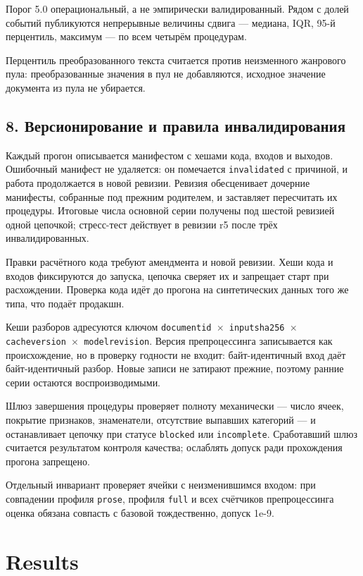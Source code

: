\documentclass[11pt,a4paper]{article}
\renewcommand{\_}{\textunderscore\allowbreak}
\begin{document}
Порог 5.0 операциональный, а не эмпирически валидированный. Рядом с долей
событий публикуются непрерывные величины сдвига — медиана, IQR, 95-й перцентиль,
максимум — по всем четырём процедурам.

Перцентиль преобразованного текста считается против неизменного жанрового пула:
преобразованные значения в пул не добавляются, исходное значение документа из
пула не убирается.

\subsection{8. Версионирование и правила инвалидирования}

Каждый прогон описывается манифестом с хешами кода, входов и выходов. Ошибочный
манифест не удаляется: он помечается \texttt{invalidated} с причиной, и работа
продолжается в новой ревизии. Ревизия обесценивает дочерние манифесты, собранные
под прежним родителем, и заставляет пересчитать их процедуры. Итоговые числа
основной серии получены под шестой ревизией одной цепочкой; стресс-тест действует
в ревизии r5 после трёх инвалидированных.

Правки расчётного кода требуют амендмента и новой ревизии. Хеши кода и входов
фиксируются до запуска, цепочка сверяет их и запрещает старт при расхождении.
Проверка кода идёт до прогона на синтетических данных того же типа, что подаёт
продакшн.

Кеши разборов адресуются ключом \texttt{document\_id $\times$ input\_sha256 $\times$ cache\_version $\times$
model\_revision}. Версия препроцессинга записывается как происхождение, но в
проверку годности не входит: байт-идентичный вход даёт байт-идентичный разбор.
Новые записи не затирают прежние, поэтому ранние серии остаются воспроизводимыми.

Шлюз завершения процедуры проверяет полноту механически — число ячеек, покрытие
признаков, знаменатели, отсутствие выпавших категорий — и останавливает цепочку
при статусе \texttt{blocked} или \texttt{incomplete}. Сработавший шлюз считается результатом
контроля качества; ослаблять допуск ради прохождения прогона запрещено.

Отдельный инвариант проверяет ячейки с неизменившимся входом: при совпадении
профиля \texttt{prose}, профиля \texttt{full} и всех счётчиков препроцессинга оценка обязана
совпасть с базовой тождественно, допуск 1e-9.

\section{Results}
\end{document}
